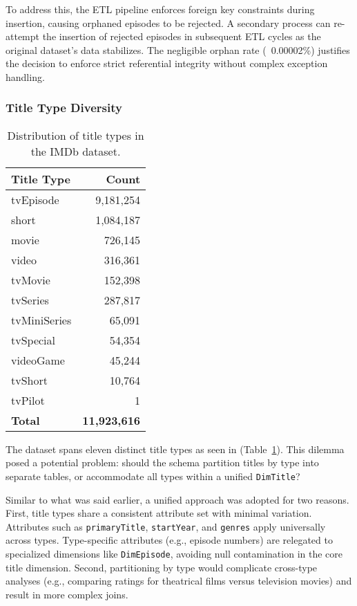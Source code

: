 To address this, the ETL pipeline enforces foreign key constraints during insertion, causing orphaned episodes to be rejected. A secondary process can re-attempt the insertion of rejected episodes in subsequent ETL cycles as the original dataset's data stabilizes. The negligible orphan rate (~0.00002\%) justifies the decision to enforce strict referential integrity without complex exception handling.

\subsubsection{Title Type Diversity}

\begin{table}[h]
  \centering
  \caption{Distribution of title types in the IMDb dataset.}
  \label{tab:title-types}
  \begin{tabular}{lr}
    \toprule
    \textbf{Title Type} & \textbf{Count} \\
    \midrule
    tvEpisode       & 9,181,254 \\
    short           & 1,084,187 \\
    movie           & 726,145   \\
    video           & 316,361   \\
    tvMovie         & 152,398   \\
    tvSeries        & 287,817   \\
    tvMiniSeries    & 65,091    \\
    tvSpecial       & 54,354    \\
    videoGame       & 45,244    \\
    tvShort         & 10,764    \\
    tvPilot         & 1         \\
    \midrule
    \textbf{Total}  & \textbf{11,923,616} \\
    \bottomrule
  \end{tabular}
\end{table}

The dataset spans eleven distinct title types as seen in (Table~\ref{tab:title-types}). This dilemma posed a potential problem: should the schema partition titles by type into separate tables, or accommodate all types within a unified \verb|DimTitle|?

Similar to what was said earlier, a unified approach was adopted for two reasons. First, title types share a consistent attribute set with minimal variation. Attributes such as \verb|primaryTitle|, \verb|startYear|, and \verb|genres| apply universally across types. Type-specific attributes (e.g., episode numbers) are relegated to specialized dimensions like \verb|DimEpisode|, avoiding null contamination in the core title dimension. Second, partitioning by type would complicate cross-type analyses (e.g., comparing ratings for theatrical films versus television movies) and result in more complex joins.

